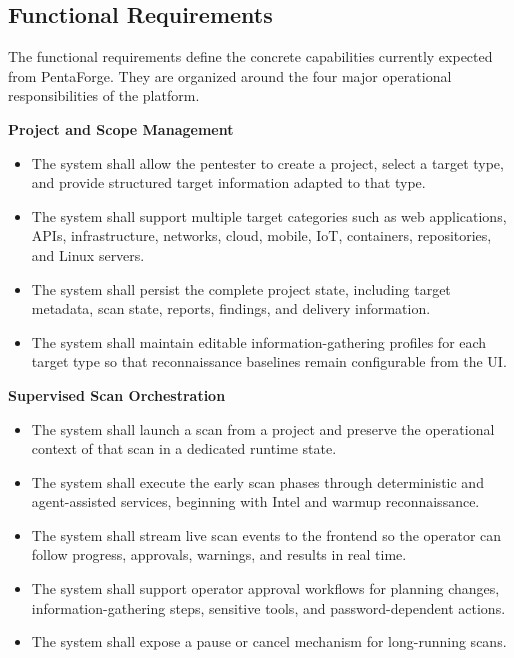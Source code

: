 \documentclass[12pt,a4paper]{report}
\begin{document}
\subsection{Functional Requirements}

The functional requirements define the concrete capabilities currently expected from
PentaForge. They are organized around the four major operational responsibilities of
the platform.

\textbf{Project and Scope Management}
\begin{itemize}
    \item The system shall allow the pentester to create a project, select a target
    type, and provide structured target information adapted to that type.
    \item The system shall support multiple target categories such as web
    applications, APIs, infrastructure, networks, cloud, mobile, IoT, containers,
    repositories, and Linux servers.
    \item The system shall persist the complete project state, including target
    metadata, scan state, reports, findings, and delivery information.
    \item The system shall maintain editable information-gathering profiles for each
    target type so that reconnaissance baselines remain configurable from the UI.
\end{itemize}

\textbf{Supervised Scan Orchestration}
\begin{itemize}
    \item The system shall launch a scan from a project and preserve the operational
    context of that scan in a dedicated runtime state.
    \item The system shall execute the early scan phases through deterministic and
    agent-assisted services, beginning with Intel and warmup reconnaissance.
    \item The system shall stream live scan events to the frontend so the operator
    can follow progress, approvals, warnings, and results in real time.
    \item The system shall support operator approval workflows for planning changes,
    information-gathering steps, sensitive tools, and password-dependent actions.
    \item The system shall expose a pause or cancel mechanism for long-running scans.
\end{itemize}
\end{document}
